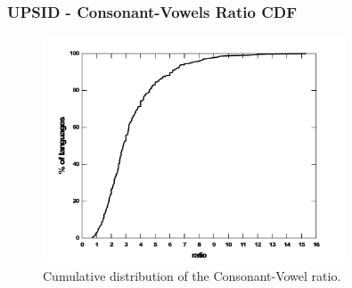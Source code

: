 \documentclass{beamer}
\begin{document}
\frame
{
  \frametitle{UPSID - Consonant-Vowels Ratio CDF}
  \vspace{-0.3cm}
  \begin{figure}[h!]
  \centering
  \includegraphics[width=0.8\textwidth]{images/cdf_cv_ratio.pdf}
  \caption{Cumulative distribution of the Consonant-Vowel ratio.}
  \label{fig:cdf_cv_ratio}
  \end{figure}
}
\end{document}
